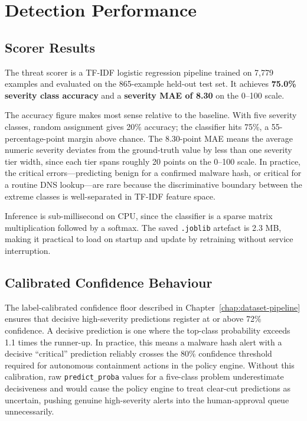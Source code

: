 \section{Detection Performance}
\label{sec:eval-detection}

\subsection{Scorer Results}

The threat scorer is a TF-IDF logistic regression pipeline trained on 7,779 examples and evaluated on the 865-example held-out test set. It achieves \textbf{75.0\% severity class accuracy} and a \textbf{severity MAE of 8.30} on the 0--100 scale.

The accuracy figure makes most sense relative to the baseline. With five severity classes, random assignment gives 20\% accuracy; the classifier hits 75\%, a 55-percentage-point margin above chance. The 8.30-point MAE means the average numeric severity deviates from the ground-truth value by less than one severity tier width, since each tier spans roughly 20 points on the 0--100 scale. In practice, the critical errors---predicting benign for a confirmed malware hash, or critical for a routine DNS lookup---are rare because the discriminative boundary between the extreme classes is well-separated in TF-IDF feature space.

Inference is sub-millisecond on CPU, since the classifier is a sparse matrix multiplication followed by a softmax. The saved \texttt{.joblib} artefact is 2.3 MB, making it practical to load on startup and update by retraining without service interruption.

\subsection{Calibrated Confidence Behaviour}

The label-calibrated confidence floor described in Chapter~\ref{chap:dataset-pipeline} ensures that decisive high-severity predictions register at or above 72\% confidence. A decisive prediction is one where the top-class probability exceeds 1.1 times the runner-up. In practice, this means a malware hash alert with a decisive ``critical'' prediction reliably crosses the 80\% confidence threshold required for autonomous containment actions in the policy engine. Without this calibration, raw \texttt{predict\_proba} values for a five-class problem underestimate decisiveness and would cause the policy engine to treat clear-cut predictions as uncertain, pushing genuine high-severity alerts into the human-approval queue unnecessarily.

